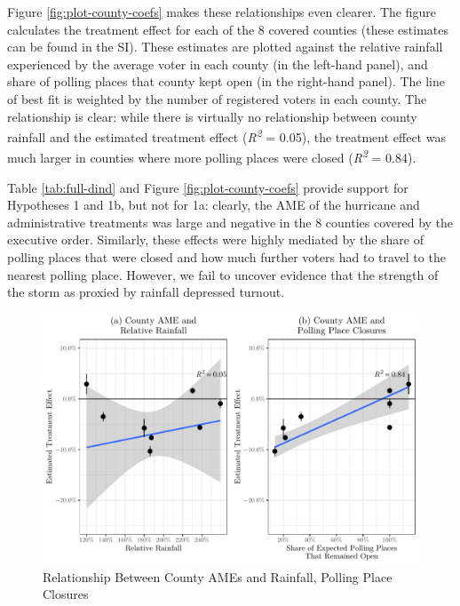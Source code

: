 \documentclass[
  12pt,
]{article}
\begin{document}
Figure \ref{fig:plot-county-coefs} makes these relationships even clearer. The figure calculates the treatment effect for each of the 8 covered counties (these estimates can be found in the SI). These estimates are plotted against the relative rainfall experienced by the average voter in each county (in the left-hand panel), and share of polling places that county kept open (in the right-hand panel). The line of best fit is weighted by the number of registered voters in each county. The relationship is clear: while there is virtually no relationship between county rainfall and the estimated treatment effect (\emph{R\textsuperscript{2}} = 0.05), the treatment effect was much larger in counties where more polling places were closed (\emph{R\textsuperscript{2}} = 0.84).

Table \ref{tab:full-dind} and Figure \ref{fig:plot-county-coefs} provide support for Hypotheses 1 and 1b, but not for 1a: clearly, the AME of the hurricane and administrative treatments was large and negative in the 8 counties covered by the executive order. Similarly, these effects were highly mediated by the share of polling places that were closed and how much further voters had to travel to the nearest polling place. However, we fail to uncover evidence that the strength of the storm as proxied by rainfall depressed turnout.

\newpage
\begin{landscape}
\begin{singlespace}

\end{singlespace}
\end{landscape}

\begin{figure}[H]

{\centering \includegraphics{hurricane_michael_files/figure-latex/rain-chunk-1} 

}

\caption{\label{fig:plot-county-coefs}Relationship Between County AMEs and Rainfall, Polling Place Closures}\label{fig:rain-chunk}
\end{figure}
\end{document}
